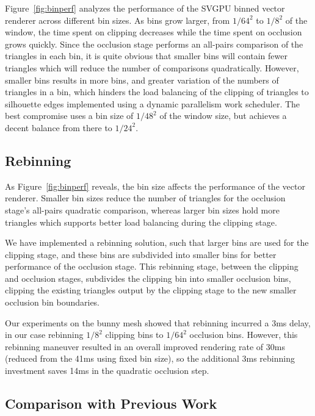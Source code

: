 \documentclass[review]{acmsiggraph}
\begin{document}
Figure~\ref{fig:binperf} analyzes the performance of the SVGPU binned vector
renderer across different bin sizes. As bins grow larger, from $1/64^2$ to
$1/8^2$ of the window, the time spent on clipping decreases while the time
spent on occlusion grows quickly. Since the occlusion stage performs an
all-pairs comparison of the triangles in each bin, it is quite obvious that
smaller bins will contain fewer triangles which will reduce the number of
comparisons quadratically. However, smaller bins results in more bins, and
greater variation of the numbers of triangles in a bin, which hinders the load
balancing of the clipping of triangles to silhouette edges implemented using a
dynamic parallelism work scheduler. The best compromise uses a bin size of
$1/48^2$ of the window size, but achieves a decent balance from there to
$1/24^2.$

\subsection{Rebinning}
As Figure~\ref{fig:binperf} reveals, the bin size affects the performance of
the vector renderer. Smaller bin sizes reduce the number of triangles for the
occlusion stage's all-pairs quadratic comparison, whereas larger bin sizes
hold more triangles which supports better load balancing during the clipping
stage.

We have implemented a rebinning solution, such that larger bins are used for
the clipping stage, and these bins are subdivided into smaller bins for better
performance of the occlusion stage. This rebinning stage, between the clipping
and occlusion stages, subdivides the clipping bin into smaller occlusion bins,
clipping the existing triangles output by the clipping stage to the new
smaller occlusion bin boundaries.

Our experiments on the bunny mesh showed that rebinning incurred a 3ms delay,
in our case rebinning $1/8^2$ clipping bins to $1/64^2$ occlusion bins.
However, this rebinning maneuver resulted in an overall improved rendering
rate of 30ms (reduced from the 41ms using fixed bin size), so the additional
3ms rebinning investment saves 14ms in the quadratic occlusion step.

\subsection{Comparison with Previous Work}
\end{document}
